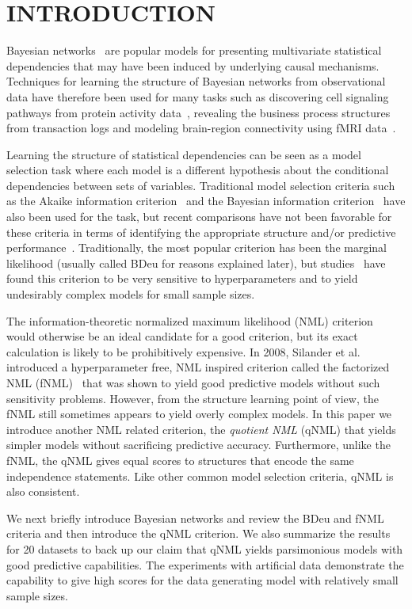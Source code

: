 \section{INTRODUCTION}
\label{sec:intro}
Bayesian networks~\cite{Pear88} are popular models for presenting
multivariate statistical dependencies that may have been induced by
underlying causal mechanisms.  Techniques for learning the structure
of Bayesian networks from observational data have therefore been used
for many tasks such as discovering cell signaling pathways from
protein activity data~\cite{bn4sigpath02}, revealing the business
process structures~\cite{bn4bpmining} from transaction logs and
modeling brain-region connectivity using fMRI
data~\cite{bn4brainconnect}.

Learning the structure of statistical dependencies can be seen as a
model selection task where each model is a different hypothesis about
the conditional dependencies between sets of variables. Traditional
model selection criteria such as the Akaike information
criterion~\cite{Akai73} and the Bayesian information
criterion~\cite{Schw78} have also been used for the task, but recent
comparisons have not been favorable for these criteria in terms of
identifying the appropriate structure and/or predictive
performance~\cite{cosco.pgm08a}. Traditionally, the most popular
criterion has been the marginal likelihood (usually called BDeu for
reasons explained later), but studies~\cite{cosco.uai07,Steck08}
have found this criterion to be very sensitive to hyperparameters
and to yield undesirably complex models for small sample sizes.

The information-theoretic normalized maximum likelihood (NML)
criterion~\cite{Shta87,Riss96a} would otherwise be an ideal candidate
for a good criterion, but its exact calculation is likely to be
prohibitively expensive. In 2008, Silander et al. introduced a
hyperparameter free, NML inspired criterion called the factorized NML
(fNML)~\cite{cosco.pgm08a} that was shown to yield good predictive
models without such sensitivity problems. However, from the structure
learning point of view, the fNML still sometimes appears to yield
overly complex models. In this paper we introduce another NML related
criterion, the \textit{quotient NML} (qNML) that yields simpler models
without sacrificing predictive accuracy. Furthermore, unlike the fNML,
the qNML gives equal scores to structures that encode the same
independence statements. Like other common model selection criteria,
qNML is also consistent.

We next briefly introduce Bayesian networks and review the BDeu and
fNML criteria and then introduce the qNML criterion.  We also
summarize the results for 20 datasets to back up our claim that qNML
yields parsimonious models with good predictive capabilities. The
experiments with artificial data demonstrate the capability to give
high scores for the data generating model with relatively small sample
sizes.

